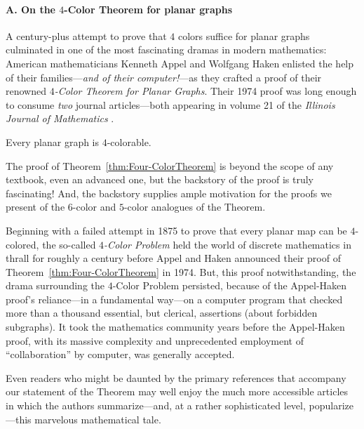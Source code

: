 \paragraph{A. On the $4$-Color Theorem for planar graphs}

A century-plus attempt to prove that $4$ colors suffice for planar graphs culminated in one of the most fascinating dramas in modern mathematics:  American mathematicians Kenneth Appel and Wolfgang Haken enlisted the help of their families---{\em and of their computer!}---as they crafted a proof of their renowned {\it $4$-Color Theorem for Planar Graphs}.  Their 1974 proof was long enough to consume {\em two} journal articles---both appearing in volume 21 of the {\it Illinois Journal of Mathematics} \cite{AppelH77a,AppelH77b}.


\begin{theorem}
\label{thm:Four-ColorTheorem}
Every planar graph is $4$-colorable.
\end{theorem}


The proof of Theorem~\ref{thm:Four-ColorTheorem} is beyond the scope of any textbook, even an advanced one, but the backstory of the proof is truly fascinating!  And, the backstory supplies ample motivation for the proofs we present of the $6$-color and $5$-color analogues of the Theorem.

\medskip

Beginning with a failed attempt in 1875 to prove that every planar map can be $4$-colored, the so-called {\it $4$-Color Problem} held the world of discrete  mathematics in thrall for roughly a century before Appel and Haken announced their proof of Theorem~\ref{thm:Four-ColorTheorem} in 1974.  But, this proof notwithstanding, the drama surrounding the $4$-Color Problem persisted, because of the Appel-Haken proof's reliance---in a fundamental way---on a computer program that checked more than a thousand essential, but clerical, assertions (about forbidden subgraphs).  It took the
mathematics community years before the Appel-Haken proof, with its massive complexity and unprecedented employment of ``collaboration'' by computer, was generally accepted.

\smallskip

Even readers who might be daunted by the primary references \cite{AppelH77a,AppelH77b} that accompany our statement of the Theorem may well enjoy the much more accessible articles \cite{AppelH77c,AppelH89} in which the authors summarize---and, at a rather sophisticated level, popularize---this marvelous mathematical tale.

